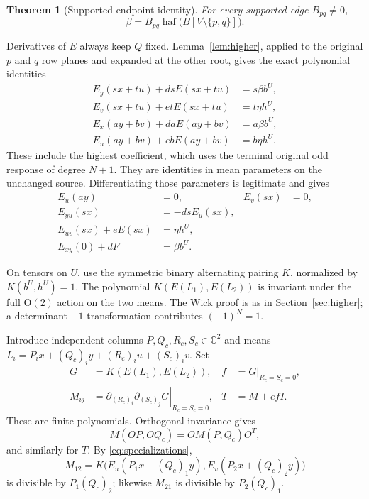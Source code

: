 \documentclass[11pt]{article}
\newtheorem{theorem}{Theorem}[section]
\theoremstyle{definition}
\theoremstyle{plain}
\numberwithin{equation}{section}
\begin{document}
\begin{theorem}[Supported endpoint identity]\label{thm:endpoint}
For every supported edge \(B_{pq}\ne0\),
\[
 \beta=B_{pq}\operatorname{haf}\bigl(B[V\setminus\{p,q\}]\bigr).
\]
\end{theorem}

Derivatives of \(E\) always keep \(Q\) fixed. Lemma~\ref{lem:higher}, applied
to the original \(p\) and \(q\) row planes and expanded at the other root,
gives the exact polynomial identities
\begin{equation}
 \begin{aligned}
 E_y(sx+tu)+dsE(sx+tu)&=s\beta b^U,\\
 E_v(sx+tu)+etE(sx+tu)&=t\eta h^U,\\
 E_x(ay+bv)+daE(ay+bv)&=a\beta b^U,\\
 E_u(ay+bv)+ebE(ay+bv)&=b\eta h^U.
 \end{aligned}
 \tag{7}\label{eq:boundary}
\end{equation}
These include the highest coefficient, which uses the terminal original odd
response of degree \(N+1\). They are identities in mean parameters on the
unchanged source. Differentiating those parameters is legitimate and gives
\begin{equation}
 \begin{aligned}
 E_u(ay)&=0,&E_v(sx)&=0,\\
 E_{yu}(sx)&=-dsE_u(sx),\\
 E_{uv}(sx)+eE(sx)&=\eta h^U,\\
 E_{xy}(0)+dF&=\beta b^U.
 \end{aligned}
 \tag{8}\label{eq:specializations}
\end{equation}

On tensors on \(U\), use the symmetric binary alternating pairing \(K\),
normalized by \(K(b^U,h^U)=1\). The polynomial
\(K(E(L_1),E(L_2))\) is invariant under the full \(\mathrm O(2)\) action
on the two means. The Wick proof is as in Section~\ref{sec:higher}; a
determinant \(-1\) transformation contributes \((-1)^N=1\).

Introduce independent columns \(P,Q_c,R_c,S_c\in\mathbb C^2\) and means
\(L_i=P_i x+(Q_c)_iy+(R_c)_iu+(S_c)_iv\). Set
\[
 \begin{aligned}
 G&=K(E(L_1),E(L_2)),& f&=G\big|_{R_c=S_c=0},\\
 M_{ij}&=\left.\partial_{(R_c)_i}\partial_{(S_c)_j}G\right|_{R_c=S_c=0},
 &T&=M+efI.
 \end{aligned}
\]
These are finite polynomials. Orthogonal invariance gives
\[
 M(OP,OQ_c)=O M(P,Q_c)O^T,
\]
and similarly for \(T\). By \eqref{eq:specializations},
\[
 M_{12}=K\bigl(E_u(P_1x+(Q_c)_1y),E_v(P_2x+(Q_c)_2y)\bigr)
\]
is divisible by \(P_1(Q_c)_2\); likewise \(M_{21}\) is divisible by
\(P_2(Q_c)_1\).
\end{document}

